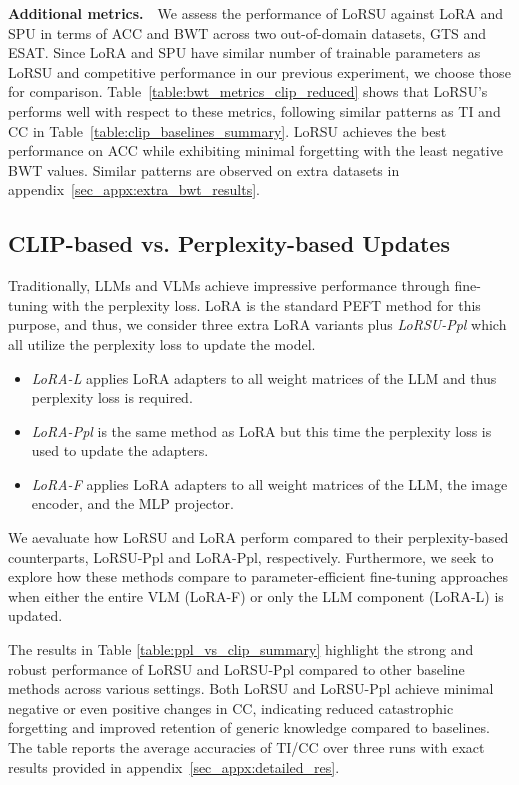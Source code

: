 



\textbf{Additional metrics.}~~We assess the performance of LoRSU against LoRA and SPU in terms of ACC and BWT across two out-of-domain datasets, GTS and ESAT. Since LoRA and SPU have similar number of trainable parameters as LoRSU and competitive performance in our previous experiment, we choose those for comparison. Table~\ref{table:bwt_metrics_clip_reduced} shows that LoRSU's  performs well with respect to these metrics, following similar patterns as TI and CC in Table~\ref{table:clip_baselines_summary}. LoRSU achieves the best performance on ACC while exhibiting minimal forgetting with the least negative BWT values. Similar patterns are observed on extra datasets in appendix~\ref{sec_appx:extra_bwt_results}. 

\subsection{CLIP-based vs. Perplexity-based Updates}
Traditionally, LLMs and VLMs achieve impressive performance through fine-tuning with the perplexity loss. LoRA is the standard PEFT method for this purpose, and thus, we consider three extra LoRA variants plus \emph{LoRSU-Ppl} which all utilize the perplexity loss to update the model. 
\begin{itemize}[noitemsep,topsep=1pt,parsep=1pt,partopsep=1pt,leftmargin=*]
    \item \emph{LoRA-L} applies LoRA adapters to all weight matrices of the LLM and thus perplexity loss is required.
    \item \emph{LoRA-Ppl} is the same method as LoRA but this time the perplexity loss is used to update the adapters.
    \item \emph{LoRA-F} applies LoRA adapters to all weight matrices of the LLM, the image encoder, and the MLP projector.
\end{itemize}

We aevaluate how LoRSU and LoRA perform compared to their perplexity-based counterparts, LoRSU-Ppl and LoRA-Ppl, respectively. Furthermore, we seek to explore how these methods compare to parameter-efficient fine-tuning approaches when either the entire VLM (LoRA-F) or only the LLM component (LoRA-L) is updated.

The results in Table \ref{table:ppl_vs_clip_summary} highlight the strong and robust performance of LoRSU and LoRSU-Ppl compared to other baseline methods across various settings. Both LoRSU and LoRSU-Ppl achieve minimal negative or even positive changes in CC, indicating reduced catastrophic forgetting and improved retention of generic knowledge compared to baselines. The table reports the average accuracies of TI/CC over three runs with exact results provided in appendix~\ref{sec_appx:detailed_res}.

